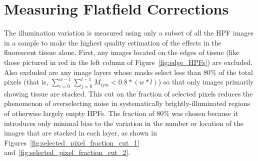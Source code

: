 \documentclass[letterpaper,11pt]{article}
\newcommand{\reffig}[1]{Figure~\ref{#1}}
\begin{document}
\section{Measuring Flatfield Corrections}
\label{sec:measuring_flatfield_corrections}

The illumination variation is measured using only a subset of all the HPF images in a sample to make the highest quality estimation of the effects in the fluorescent tissue alone. First, any images located on the edges of tissue (like those pictured in red in the left column of \reffig{fig:edge_HPFs}) are excluded. Also excluded are any image layers whose masks select less than 80\% of the total pixels (that is, $\sum_{i=0}^{w-1}\sum_{j=0}^{l-1}M_{ijm}<0.8*(w*l)$) so that only images primarily showing tissue are stacked. This cut on the fraction of selected pixels reduces the phenomenon of overselecting noise in systematically brightly-illuminated regions of otherwise largely empty HPFs. The fraction of 80\% was chosen because it introduces only minimal bias to the variation in the number or location of the images that are stacked in each layer, as shown in Figures~\ref{fig:selected_pixel_fraction_cut_1} and~\ref{fig:selected_pixel_fraction_cut_2}.
\end{document}
